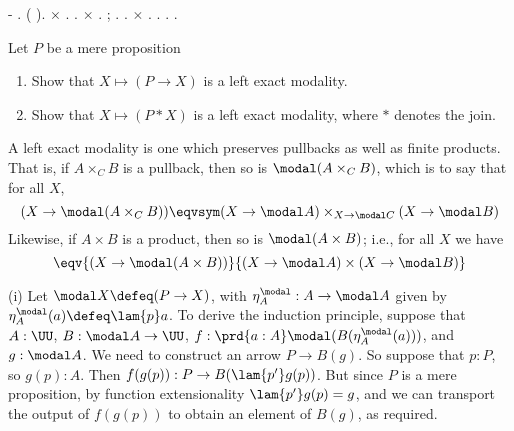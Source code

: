 \begin{coqdoccode}
-    .\coqdoceol
\coqdocindent{2.00em}
 ( \coqdocvar{\_} \coqdocvar{\_} \coqdocvar{\_} \coqdocvar{\_}).\coqdoceol
\coqdocindent{2.00em}
\ensuremath{\times}  .  .\coqdoceol
\coqdocindent{2.00em}
\ensuremath{\times}  .  ;  . .\coqdoceol
\coqdocindent{2.00em}
\ensuremath{\times}  .  .\coqdoceol
\coqdocnoindent
{}.\coqdoceol
\coqdocemptyline
\coqdocnoindent
{} .\coqdoceol
\coqdocemptyline
\coqdocemptyline
\end{coqdoccode}
Let $P$ be a mere proposition
\begin{enumerate}
\item Show that $X \mapsto (P \to X)$ is a left exact modality.
\item Show that $X \mapsto (P * X)$ is a left exact modality, where $*$ denotes
    the join.
\end{enumerate}


 \soln
A left exact modality is one which preserves pullbacks as well as finite
products.  That is, if $A \times _{C} B$ is a pullback, then so is
$\modal (A \times_{C} B)$, which is to say that for all $X$,
\[
  (X \to \modal(A \times_{C} B))
  \eqvsym
  (X \to \modal A) \times_{X \to \modal C} (X \to \modal B)
\]
Likewise, if $A \times B$ is a product, then so is $\modal(A \times B)$;
i.e., for all $X$ we have
\[
  \eqv{
    (X \to \modal(A \times B)) 
  }{
    (X \to \modal A) \times (X \to \modal B)
  }
\]


\vspace{.1in}
\noindent
(i) Let $\modal X \defeq (P \to X)$, with $\eta^{\modal}_{A} : A \to
\modal A$ given by $\eta^{\modal}_{A}(a) \defeq \lam{p}a$.  To derive the
induction principle, suppose that $A : \UU$, $B : \modal A \to \UU$, $f :
\prd{a:A}\modal(B(\eta^{\modal}_{A}(a)))$, and $g : \modal A$.  We need to
construct an arrow $P \to B(g)$.  So suppose that $p : P$, so $g(p) : A$.  Then
$f(g(p)) : P \to B(\lam{p'}g(p))$.  But since $P$ is a mere proposition, by
function extensionality $\lam{p'}g(p) = g$, and we can transport the output of
$f(g(p))$ to obtain an element of $B(g)$, as required.


